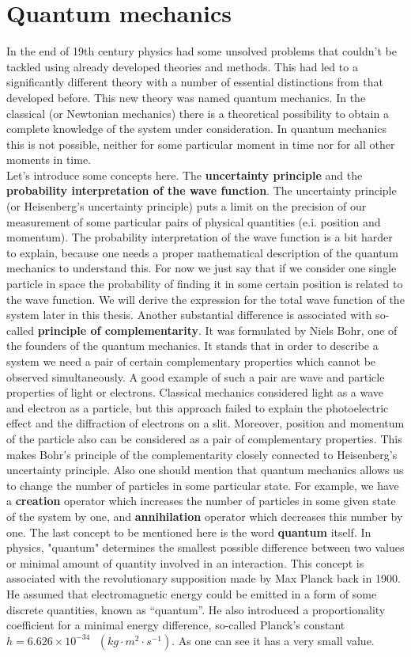 \documentclass[twoside,english]{uiofysmaster}
\theoremstyle{definition}
\begin{document}
\chapter{Quantum mechanics}
In the end of 19th century physics had some unsolved problems that couldn't be tackled using already developed theories and methods. This had led to a  significantly different theory with a number of essential distinctions  from that developed before. This new theory was named quantum mechanics. In the classical (or Newtonian mechanics) there is a theoretical possibility to obtain a complete knowledge of the system under consideration. In quantum mechanics this is not possible, neither for some particular moment in time  nor for all other  moments in time. \\
Let's introduce some concepts here. The \textbf{uncertainty principle} and the \textbf{probability interpretation of the wave function}. The  uncertainty principle (or Heisenberg's uncertainty principle) puts a limit on the precision of our measurement of some particular pairs of physical quantities (e.i. position and momentum). The probability interpretation of the wave function is a bit harder to explain, because one needs a proper mathematical description of the quantum mechanics to understand this. For now we just say that if we consider one single particle in space the probability of finding it in some certain position is related to the wave function. We will derive the expression for the total wave function of the system later in this thesis. Another 
substantial difference is associated with so-called \textbf{principle of complementarity}. It was formulated by  Niels Bohr, one of the founders of the quantum mechanics. It stands that in order to describe a system we need a pair of certain complementary properties which cannot be observed simultaneously. A good example of such a pair are wave and particle properties of light or electrons. Classical mechanics considered light as a wave and electron as a particle, but this approach failed to explain the photoelectric effect and the diffraction of electrons on a slit. Moreover, position and momentum of the particle also can be considered as a pair of complementary properties. This makes Bohr's principle of the complementarity closely connected to Heisenberg's uncertainty principle. Also one should mention that quantum mechanics allows us to change the number of particles in some particular state. For example, we have a \textbf{creation} operator which increases the number of particles in some given state of the system by one, and \textbf{annihilation} operator which decreases this number by one. The last concept to be mentioned here is the word \textbf{quantum} itself. In physics, "quantum" determines the smallest possible difference between two values or minimal amount of quantity involved in an interaction. This concept is associated with the revolutionary supposition made by Max Planck back in 1900. He assumed that electromagnetic energy could be emitted in a form of some discrete quantities, known as “quantum”. He also introduced a proportionality coefficient for a minimal energy difference, so-called Planck's constant $h = 6.626 \times 10^{-34} \text{ } (kg \cdot m^2\cdot s^{-1})$. As one can see it has a very small value.  \\
\end{document}
